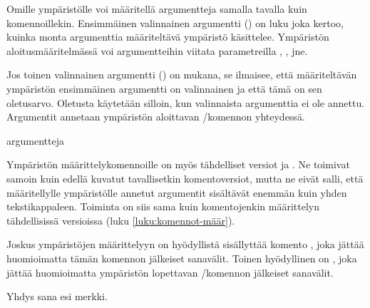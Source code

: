 \begin{koodilohkosis}
  \newenvironment{ymp}
  {\begin{mahtavuus}
      \omia\hienoja\asetuksia}
    {\end{mahtavuus}}
\end{koodilohkosis}

Omille ympäristölle voi määritellä argumentteja samalla tavalla kuin
komennoillekin. Ensimmäinen valinnainen argumentti () on luku
joka kertoo, kuinka monta argumenttia määriteltävä ympäristö käsittelee.
Ympäristön aloitusmääritelmässä voi argumentteihin viitata parametreilla
, ,  jne.

Jos toinen valinnainen argumentti () on mukana, se
ilmaisee, että määriteltävän ympäristön ensimmäinen argumentti on
valinnainen ja että tämä on sen ole\-tus\-arvo. Oletusta käytetään
silloin, kun valinnaista argumenttia ei ole annettu. Argumentit annetaan
ympäristön aloittavan \-/komennon yhteydessä.

\begin{koodilohkosis}
  \begin{ymp}[valinnainen]{argu}{mentteja}
  \end{ymp}
\end{koodilohkosis}

Ympäristön määrittelykomennoille on myös tähdelliset versiot
 ja . Ne
toimivat samoin kuin edellä kuvatut tavallisetkin komentoversiot, mutta
ne eivät salli, että määritellylle ympäristölle annetut argumentit
sisältävät enemmän kuin yhden tekstikappaleen. Toiminta on siis sama
kuin komentojenkin määrittelyn tähdellisissä versioissa (luku
\ref{luku:komennot-määr}).

\begin{koodilohkosis}
  \newenvironment*   {nimi}[n][oletus]{aloitus}{lopetus}
  \renewenvironment* {nimi}[n][oletus]{aloitus}{lopetus}
\end{koodilohkosis}

Joskus ympäristöjen määrittelyyn on hyödyllistä sisällyttää komento
, joka jättää huomioimatta tämän komennon
jälkeiset sanavälit. Toinen hyödyllinen on , joka jättää huomioimatta ympäristön
lopettavan \-/komennon jälkeiset sanavälit.


\begin{koodilohkosis}
  \newenvironment{ymp}
    {Yhdys\ignorespaces}
    {esi\ignorespacesafterend}

  \begin{ymp}
    sana%
  \end{ymp}   merkki.
\end{koodilohkosis}


